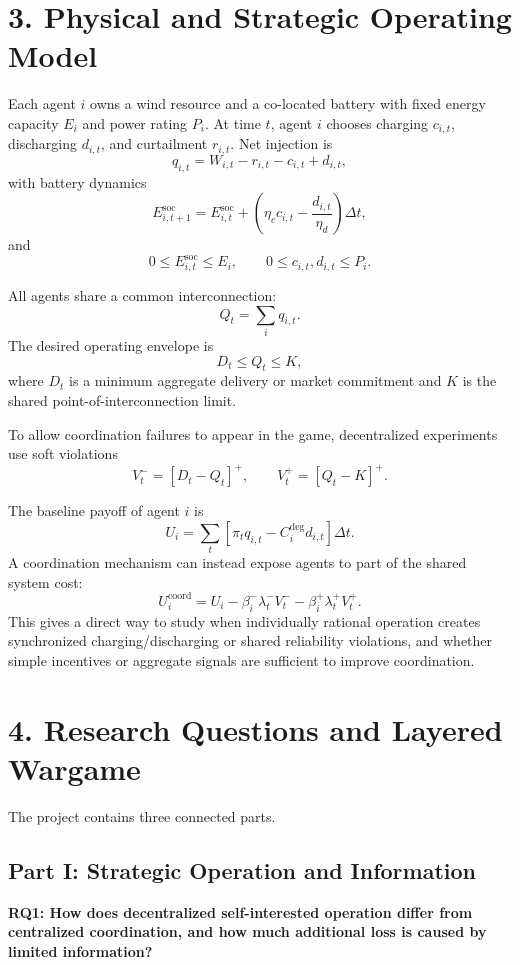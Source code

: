 \documentclass[10pt]{article}
\begin{document}
\section*{3. Physical and Strategic Operating Model}

Each agent $i$ owns a wind resource and a co-located battery with fixed energy capacity $E_i$ and power rating $P_i$. At time $t$, agent $i$ chooses charging $c_{i,t}$, discharging $d_{i,t}$, and curtailment $r_{i,t}$. Net injection is
\[
q_{i,t}=W_{i,t}-r_{i,t}-c_{i,t}+d_{i,t},
\]
with battery dynamics
\[
E^{\mathrm{soc}}_{i,t+1}
=
E^{\mathrm{soc}}_{i,t}
+
\left(
\eta_c c_{i,t}
-\frac{d_{i,t}}{\eta_d}
\right)\Delta t,
\]
and
\[
0\le E^{\mathrm{soc}}_{i,t}\le E_i,
\qquad
0\le c_{i,t},d_{i,t}\le P_i.
\]

All agents share a common interconnection:
\[
Q_t=\sum_i q_{i,t}.
\]
The desired operating envelope is
\[
D_t\le Q_t\le K,
\]
where $D_t$ is a minimum aggregate delivery or market commitment and $K$ is the shared point-of-interconnection limit.

To allow coordination failures to appear in the game, decentralized experiments use soft violations
\[
V_t^-=[D_t-Q_t]^+,
\qquad
V_t^+=[Q_t-K]^+.
\]

The baseline payoff of agent $i$ is
\[
U_i
=
\sum_t
\left[
\pi_t q_{i,t}
-
C_i^{\mathrm{deg}}d_{i,t}
\right]\Delta t.
\]
A coordination mechanism can instead expose agents to part of the shared system cost:
\[
U_i^{\mathrm{coord}}
=
U_i
-
\beta_i^-\lambda_t^-V_t^-
-
\beta_i^+\lambda_t^+V_t^+.
\]
This gives a direct way to study when individually rational operation creates synchronized charging/discharging or shared reliability violations, and whether simple incentives or aggregate signals are sufficient to improve coordination.

\section*{4. Research Questions and Layered Wargame}

The project contains three connected parts.

\subsection*{Part I: Strategic Operation and Information}

\textbf{RQ1: How does decentralized self-interested operation differ from centralized coordination, and how much additional loss is caused by limited information?}
\end{document}
